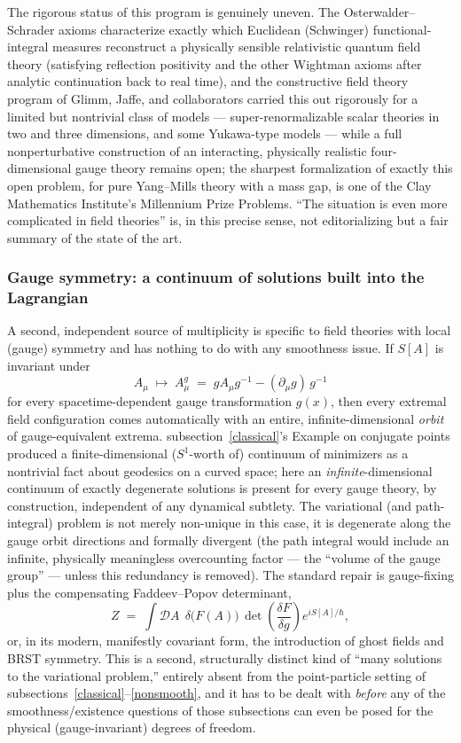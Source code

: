 The rigorous status of this program is genuinely uneven. The
Osterwalder--Schrader axioms characterize exactly which Euclidean (Schwinger)
functional-integral measures reconstruct a physically sensible relativistic
quantum field theory (satisfying reflection positivity and the other Wightman
axioms after analytic continuation back to real time), and the constructive
field theory program of Glimm, Jaffe, and collaborators carried this out
rigorously for a limited but nontrivial class of models ---
super-renormalizable scalar theories in two and three dimensions, and some
Yukawa-type models --- while a full nonperturbative construction of an
interacting, physically realistic four-dimensional gauge theory remains open;
the sharpest formalization of exactly this open problem, for pure Yang--Mills
theory with a mass gap, is one of the Clay Mathematics Institute's Millennium
Prize Problems. ``The situation is even more complicated in field theories''
is, in this precise sense, not editorializing but a fair summary of the state
of the art.

\subsubsection{Gauge symmetry: a continuum of solutions built into the
Lagrangian}

A second, independent source of multiplicity is specific to field theories with
local (gauge) symmetry and has nothing to do with any smoothness issue. If
$S[A]$ is invariant under
\[
A_\mu \;\longmapsto\; A_\mu^{g} \;=\; g A_\mu g^{-1} - (\partial_\mu g)\, g^{-1}
\]
for every spacetime-dependent gauge transformation $g(x)$, then every extremal
field configuration comes automatically with an entire, infinite-dimensional
\emph{orbit} of gauge-equivalent extrema. subsection~\ref{classical}'s Example
on conjugate points produced a finite-dimensional ($S^1$-worth of) continuum of
minimizers as a nontrivial fact about geodesics on a curved space; here an
\emph{infinite}-dimensional continuum of exactly degenerate solutions is
present for every gauge theory, by construction, independent of any dynamical
subtlety. The variational (and path-integral) problem is not merely non-unique
in this case, it is degenerate along the gauge orbit directions and formally
divergent (the path integral would include an infinite, physically meaningless
overcounting factor --- the ``volume of the gauge group'' --- unless this
redundancy is removed). The standard repair is gauge-fixing plus the
compensating Faddeev--Popov determinant,
\[
Z \;=\; \int \mathcal{D} A\;\, \delta\bigl(F(A)\bigr)\, 
\det\!\left(\frac{\delta F}{\delta g}\right) e^{iS[A]/\hbar},
\]
or, in its modern, manifestly covariant form, the introduction of ghost fields
and BRST symmetry. This is a second, structurally distinct kind of ``many
solutions to the variational problem,'' entirely absent from the point-particle
setting of subsections~\ref{classical}--\ref{nonsmooth}, and it has to be dealt
with \emph{before} any of the smoothness/existence questions of those
subsections can even be posed for the physical (gauge-invariant) degrees of
freedom.

